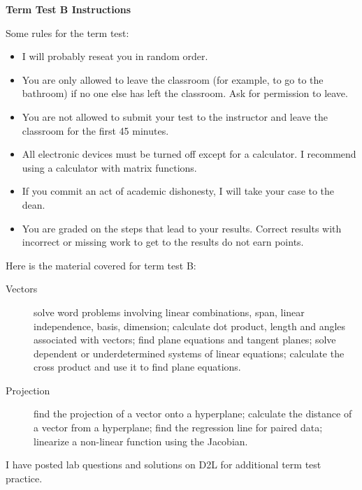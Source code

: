 \documentclass[11pt]{article}
\begin{document}
\textbf{Term Test B Instructions}

Some rules for the term test:
\begin{itemize}
\item I will probably reseat you in random order.
\item You are only allowed to leave the classroom (for example, to go
  to the bathroom) if no one else has left the classroom. Ask for
  permission to leave. 
\item You are not allowed to submit your test to the instructor and
  leave the classroom for the first 45 minutes.
\item All electronic devices must be turned off except for a
  calculator. I recommend using a calculator with matrix functions.
\item If you commit an act of academic dishonesty, I will take your
  case to the dean.
\item You are graded on the steps that lead to your results. Correct
  results with incorrect or missing work to get to the results do not
  earn points.
\end{itemize}

Here is the material covered for term test B:
\begin{description}
\item[Vectors] solve word problems involving linear combinations,
  span, linear independence, basis, dimension; calculate dot product, length and
  angles associated with vectors; find plane equations and tangent
  planes; solve dependent or underdetermined systems of linear
  equations; calculate the cross product and use it to find plane equations.
\item[Projection] find the projection of a vector onto a hyperplane;
  calculate the distance of a vector from a hyperplane; find the
  regression line for paired data; linearize a non-linear function
  using the Jacobian.
\end{description}

I have posted lab questions and solutions on D2L for additional term
test practice.
\end{document}
